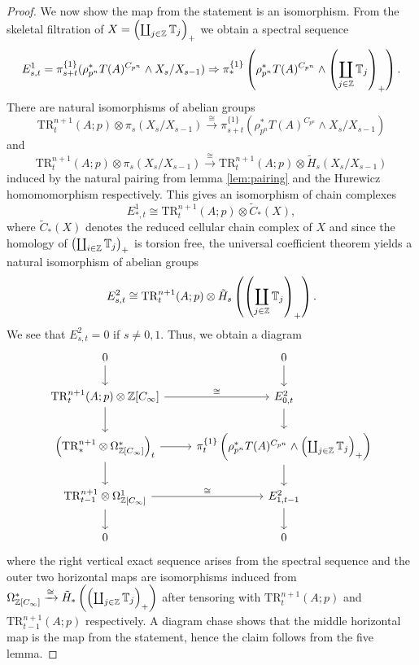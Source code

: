 \begin{proof}
We now show the map from the statement is an isomorphism.
From the skeletal filtration of 
$X=\left( \coprod_{j\in \mathbb{Z}} \mathbb{T}_j \right)_+$ we obtain a spectral sequence
\[
E^1_{s,t}=\pi^{\{1\}}_{s+t}(\rho_{p^n}^\ast T(A)^{C_{p^n}}
\wedge X_s/X_{s-1})
\Rightarrow 
\pi^{\{1\}}_\ast\left(\rho_{p^n}^\ast T(A)^{C_{p^n}}
\wedge \left( \coprod_{j\in \mathbb{Z}} \mathbb{T}_j \right)_+\right).
\]
There are natural isomorphisms of abelian groups
\[
\mathrm{TR}^{n+1}_t(A;p)\otimes\pi_s(X_s/X_{s-1}) \xrightarrow{\cong}
\pi^{\{1\}}_{s+t}(\rho_{p^n}^\ast T(A)^{C_{p^n}}
\wedge X_s/X_{s-1})\]
and
\[
\mathrm{TR}^{n+1}_t(A;p)\otimes\pi_s(X_s/X_{s-1}) \xrightarrow{\cong} 
\mathrm{TR}^{n+1}_t(A;p)\otimes \tilde H_s(X_s/X_{s-1})
\]
induced by the natural pairing from lemma \ref{lem:pairing}
and the Hurewicz homomomorphism respectively.
This gives an isomorphism of chain complexes
\[
E^1_{\ast, t}\cong \mathrm{TR}^{n+1}_t(A;p)\otimes \tilde C_\ast(X),
\]
where $\tilde C_\ast(X)$ denotes the reduced cellular chain complex of $X$
and since the homology of $\left( \coprod_{i\in \mathbb{Z}} \mathbb{T}_j \right)_+$ 
is torsion free, the universal coefficient theorem yields a natural isomorphism
of abelian groups
\[
E^2_{s,t}\cong \mathrm{TR}^{n+1}_t(A;p)\otimes
 \tilde H_s\left(\left( \coprod_{j\in \mathbb{Z}} \mathbb{T}_j \right)_+\right).
 \]
We see that $E^2_{s,t}=0$ if $s\neq0,1$. Thus, we obtain a diagram
\[
\begin{tikzcd}
0\arrow{d}
&0\arrow{d} \\
\mathrm{TR}^{n+1}_t(A;p)\otimes \ZZ[C_\infty]
\arrow{d}\arrow{r}{\cong}
&E^2_{0,t}
\arrow{d} 
\\
\left(\mathrm{TR}^{n+1}_\ast\otimes \Omega^\ast_{\ZZ[C_\infty]}\right)_t
\arrow{r}\arrow{d}
&\pi^{\{1\}}_t\left(\rho_{p^n}^\ast T(A)^{C_{p^n}}\wedge \left( \coprod_{j\in \ZZ} \TT_j \right)_+\right)\arrow{d}\\
\mathrm{TR}^{n+1}_{t-1}\otimes \Omega^1_{\ZZ[C_\infty]} 
\arrow{d}\arrow{r}{\cong} 
&E^2_{1,t-1}
\arrow{d} \\
0
&0
\end{tikzcd}
\]
where the right vertical exact sequence arises from 
the spectral sequence and the outer two horizontal maps 
are isomorphisms induced from 
$\Omega^\ast_{\mathbb{Z}[C_\infty]}\xrightarrow{\cong} 
\tilde H_\ast\left(\left( \coprod_{j\in \mathbb{Z}} \mathbb{T}_j \right)_+\right)$ 
after tensoring with $\mathrm{TR}^{n+1}_t(A;p)$ and 
$\mathrm{TR}^{n+1}_{t-1}(A;p)$ respectively. A diagram 
chase shows that the middle horizontal map is the map from 
the statement, hence the claim follows from the five lemma.
\end{proof}

